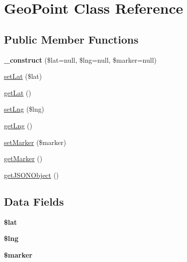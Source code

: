 \hypertarget{class_geo_point}{\section{Geo\+Point Class Reference}
\label{class_geo_point}
}
\subsection*{Public Member Functions}
\begin{DoxyCompactItemize}
\item 
\hypertarget{class_geo_point_a88f81ee02f563b3490d55fe1bdd0e836}{{\bfseries \+\_\+construct} (\$lat=null, \$lng=null, \$marker=null)}\label{class_geo_point_a88f81ee02f563b3490d55fe1bdd0e836}

\item 
\hyperlink{class_geo_point_a25b3098601cade6a6a1067a1dfae110b}{set\+Lat} (\$lat)
\item 
\hyperlink{class_geo_point_ace4646478052fb05a9226af2f1db07fa}{get\+Lat} ()
\item 
\hyperlink{class_geo_point_a24f91fc3534738f0839a11cb2306b142}{set\+Lng} (\$lng)
\item 
\hyperlink{class_geo_point_a438a7c3b088658ca987ee34416992249}{get\+Lng} ()
\item 
\hyperlink{class_geo_point_ad0f2f172f10d36d59a41310c41d88f6a}{set\+Marker} (\$marker)
\item 
\hyperlink{class_geo_point_a4a04a0eb21cd8fe73a9e02ac94824b48}{get\+Marker} ()
\item 
\hyperlink{class_geo_point_a9f94aa39d469f7968687eff905f71fbb}{get\+J\+S\+O\+N\+Object} ()
\end{DoxyCompactItemize}
\subsection*{Data Fields}
\begin{DoxyCompactItemize}
\item 
\hypertarget{class_geo_point_af498b42b83afed4dfe0af05fd802776c}{{\bfseries \$lat}}\label{class_geo_point_af498b42b83afed4dfe0af05fd802776c}

\item 
\hypertarget{class_geo_point_ab27bfa6a9380a8d89e1a8e001b276410}{{\bfseries \$lng}}\label{class_geo_point_ab27bfa6a9380a8d89e1a8e001b276410}

\item 
\hypertarget{class_geo_point_aad34fbf53cda6bd8a3a9c46764d534fa}{{\bfseries \$marker}}\label{class_geo_point_aad34fbf53cda6bd8a3a9c46764d534fa}

\end{DoxyCompactItemize}


